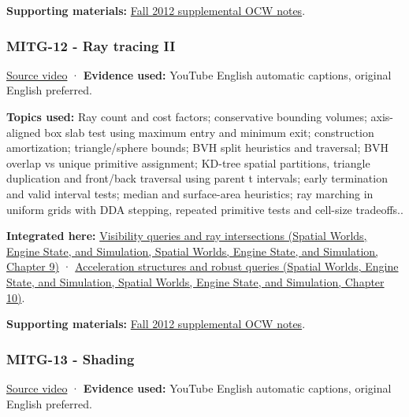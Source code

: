 \textbf{Supporting materials:} \href{https://ocw.mit.edu/courses/6-837-computer-graphics-fall-2012/pages/lecture-notes/}{Fall 2012 supplemental OCW notes}.

\subsubsection{MITG-12 - Ray tracing II}\label{04-visual-computing-ii-ch036-mitg-12---ray-tracing-ii}

\href{https://www.youtube.com/watch?v=mr_fHXW2YxE}{Source video} · \textbf{Evidence used:} YouTube English automatic captions, original English preferred.

\textbf{Topics used:} Ray count and cost factors; conservative bounding volumes; axis-aligned box slab test using maximum entry and minimum exit; construction amortization; triangle/sphere bounds; BVH split heuristics and traversal; BVH overlap vs unique primitive assignment; KD-tree spatial partitions, triangle duplication and front/back traversal using parent t intervals; early termination and valid interval tests; median and surface-area heuristics; ray marching in uniform grids with DDA stepping, repeated primitive tests and cell-size tradeoffs..

\textbf{Integrated here:} \href{../05-Spatial-Worlds-Engine-State-and-Simulation/main.pdf\#nameddest=04-visual-computing-ii-ch028-visibility-queries-and-ray-intersections-1}{Visibility queries and ray intersections (Spatial Worlds, Engine State, and Simulation, Spatial Worlds, Engine State, and Simulation, Chapter 9)} · \href{../05-Spatial-Worlds-Engine-State-and-Simulation/main.pdf\#nameddest=04-visual-computing-ii-ch029-acceleration-structures-and-robust-queries-1}{Acceleration structures and robust queries (Spatial Worlds, Engine State, and Simulation, Spatial Worlds, Engine State, and Simulation, Chapter 10)}.

\textbf{Supporting materials:} \href{https://ocw.mit.edu/courses/6-837-computer-graphics-fall-2012/pages/lecture-notes/}{Fall 2012 supplemental OCW notes}.

\subsubsection{MITG-13 - Shading}\label{04-visual-computing-ii-ch036-mitg-13---shading}

\href{https://www.youtube.com/watch?v=0xmeaXs5-ZU}{Source video} · \textbf{Evidence used:} YouTube English automatic captions, original English preferred.

